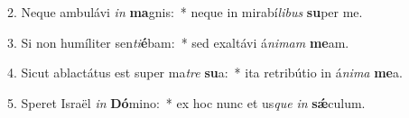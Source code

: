 2. Neque ambulávi \textit{in} \textbf{ma}gnis:~*  neque in mirabí\textit{li}\textit{bus} \textbf{su}per me.\

3. Si non humíliter sen\textit{ti}\textbf{é}bam:~*  sed exaltávi á\textit{ni}\textit{mam} \textbf{me}am.\

4. Sicut ablactátus est super ma\textit{tre} \textbf{su}a:~*  ita retribútio in á\textit{ni}\textit{ma} \textbf{me}a.\

5. Speret Israël \textit{in} \textbf{Dó}mino:~*  ex hoc nunc et us\textit{que} \textit{in} \textbf{sǽ}culum.\

